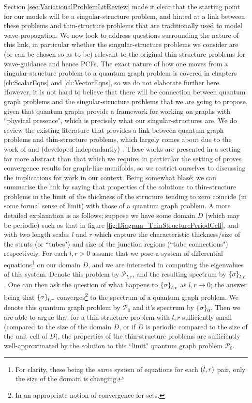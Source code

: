 Section \ref{sec:VariationalProblemLitReview} made it clear that the starting point for our models will be a singular-structure problem, and hinted at a link between these problems and thin-structure problems that are traditionally used to model wave-propagation.
We now look to address questions surrounding the nature of this link, in particular whether the singular-structure problems we consider are (or can be chosen so as to be) relevant to the original thin-structure problems for wave-guidance and hence PCFs.
The exact nature of how one moves from a singular-structure problem to a quantum graph problem is covered in chapters \ref{ch:ScalarEqns} and \ref{ch:VectorEqns}, so we do not elaborate further here.
However, it is not hard to believe that there will be connection between quantum graph problems and the singular-structure problems that we are going to propose, given that quantum graphs provide a framework for working on graphs with ``physical presence", which is precisely what our singular-structures are.
We do review the existing literature that provides a link between quantum graph problems and thin-structure problems, which largely comes about due to the work of \cite{kuchment2001convergence} and (developed independantly) \cite{exner2005convergence}.
These works are presented in a setting far more abstract than that which we require; in particular the setting of \cite{exner2005convergence} proves convergence results for graph-like manifolds, so we restrict ourselves to discussing the implications for work in our context.
Being somewhat blas\'e; we can summarise the link by saying that properties of the solutions to thin-structure problems in the limit of the thickness of the structure tending to zero coincide (in some formal sense of limit) with those of a quantum graph problem.
A more detailed explanation is as follows; suppose we have some domain $D$ (which may be periodic) such as that in figure \ref{fig:Diagram_ThinStructurePeriodCell}, and with two length scales $l$ and $r$ which capture the characteristic thickness/size of the struts (or ``tubes") and size of the junction regions (``tube connections") respectively.
For each $l,r>0$ assume that we pose a system of differential equations\footnote{For clarity, these being the \emph{same} system of equations for each $\left( l,r \right)$ pair, only the size of the domain is changing.} on our domain $D$, and we are interested in computing the eigenvalues of this system.
Denote this problem by $\mathcal{P}_{l,r}$, and the resulting spectrum by $\left\{ \sigma \right\}_{l,r}$.
One can then ask the question of what happens to $\left\{ \sigma \right\}_{l,r}$ as $l,r\rightarrow0$; the answer being that $\left\{ \sigma \right\}_{l,r}$ converges\footnote{In an appropriate notion of convergence for sets.} to the spectrum of a quantum graph problem.
We denote this quantum graph problem by $\mathcal{P}_0$ and it's spectrum by $\left\{ \sigma \right\}_0$.
Then we are able to argue that for a thin-structure problem with $l,r$ sufficiently small (compared to the size of the domain $D$, or if $D$ is periodic compared to the size of the unit cell of $D$), the properties of the thin-structure problems are sufficiently well-approximated by the solution to this ``limit" quantum graph problem $\mathcal{P}_0$. \newline

